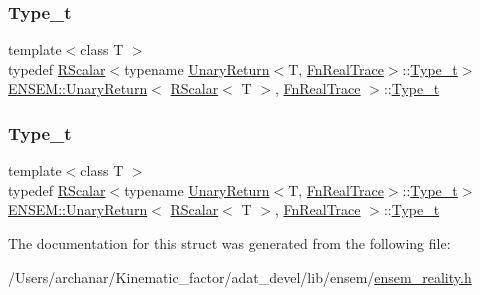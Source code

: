 \subsubsection{\texorpdfstring{Type\_t}{Type\_t}\hspace{0.1cm}{\footnotesize\ttfamily [1/2]}}
{\footnotesize\ttfamily template$<$class T $>$ \\
typedef \mbox{\hyperlink{classENSEM_1_1RScalar}{R\+Scalar}}$<$typename \mbox{\hyperlink{structENSEM_1_1UnaryReturn}{Unary\+Return}}$<$T, \mbox{\hyperlink{structENSEM_1_1FnRealTrace}{Fn\+Real\+Trace}}$>$\+::\mbox{\hyperlink{structENSEM_1_1UnaryReturn_3_01RScalar_3_01T_01_4_00_01FnRealTrace_01_4_a686ea10aaa6f33a08566c94481d3e172}{Type\+\_\+t}}$>$ \mbox{\hyperlink{structENSEM_1_1UnaryReturn}{E\+N\+S\+E\+M\+::\+Unary\+Return}}$<$ \mbox{\hyperlink{classENSEM_1_1RScalar}{R\+Scalar}}$<$ T $>$, \mbox{\hyperlink{structENSEM_1_1FnRealTrace}{Fn\+Real\+Trace}} $>$\+::\mbox{\hyperlink{structENSEM_1_1UnaryReturn_3_01RScalar_3_01T_01_4_00_01FnRealTrace_01_4_a686ea10aaa6f33a08566c94481d3e172}{Type\+\_\+t}}}

\mbox{\label{structENSEM_1_1UnaryReturn_3_01RScalar_3_01T_01_4_00_01FnRealTrace_01_4_a686ea10aaa6f33a08566c94481d3e172}} 
\subsubsection{\texorpdfstring{Type\_t}{Type\_t}\hspace{0.1cm}{\footnotesize\ttfamily [2/2]}}
{\footnotesize\ttfamily template$<$class T $>$ \\
typedef \mbox{\hyperlink{classENSEM_1_1RScalar}{R\+Scalar}}$<$typename \mbox{\hyperlink{structENSEM_1_1UnaryReturn}{Unary\+Return}}$<$T, \mbox{\hyperlink{structENSEM_1_1FnRealTrace}{Fn\+Real\+Trace}}$>$\+::\mbox{\hyperlink{structENSEM_1_1UnaryReturn_3_01RScalar_3_01T_01_4_00_01FnRealTrace_01_4_a686ea10aaa6f33a08566c94481d3e172}{Type\+\_\+t}}$>$ \mbox{\hyperlink{structENSEM_1_1UnaryReturn}{E\+N\+S\+E\+M\+::\+Unary\+Return}}$<$ \mbox{\hyperlink{classENSEM_1_1RScalar}{R\+Scalar}}$<$ T $>$, \mbox{\hyperlink{structENSEM_1_1FnRealTrace}{Fn\+Real\+Trace}} $>$\+::\mbox{\hyperlink{structENSEM_1_1UnaryReturn_3_01RScalar_3_01T_01_4_00_01FnRealTrace_01_4_a686ea10aaa6f33a08566c94481d3e172}{Type\+\_\+t}}}



The documentation for this struct was generated from the following file\+:\begin{DoxyCompactItemize}
\item 
/\+Users/archanar/\+Kinematic\+\_\+factor/adat\+\_\+devel/lib/ensem/\mbox{\hyperlink{lib_2ensem_2ensem__reality_8h}{ensem\+\_\+reality.\+h}}\end{DoxyCompactItemize}
